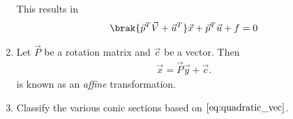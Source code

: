 \begin{enumerate}[label=\arabic*.,ref=\thesubsection.\theenumi]
%
This results in
\begin{equation}
\brak{\vec{p}^T\vec{V}+\vec{u}^T}\vec{x} + \vec{p}^T\vec{u} +f = 0
\label{eq:tangent}
\end{equation}

\item Let $\vec{P}$ be a rotation matrix and  $\vec{c}$ be a vector. Then 
\begin{align}
\vec{x} = \vec{P}\vec{y}+\vec{c}.
\label{eq:affine}
\end{align}
 is known as an {\em affine} transformation.
\item Classify the various conic sections based on $\eqref{eq:quadratic_vec}$.
\\
\solution 
\begin{table}[!ht]
\begin{center}

\end{center}
\caption{}
\label{table:conics}
\end{table}

\end{enumerate}
